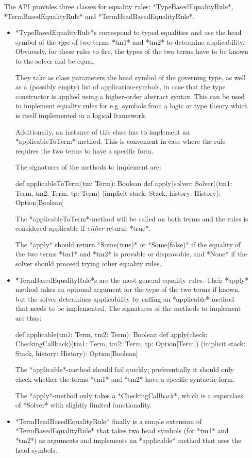 The \mmt API provides three classes for equality rules: *TypeBasedEqualityRule*, *TermBasedEqualityRule* and *TermHeadBasedEqualityRule*.
\begin{itemize}
	\item *TypeBasedEqualityRule*s correspond to typed equalities and use the head symbol of the \emph{type} of two terms *tm1* and *tm2* to determine applicability. Obviously, for these rules to fire, the types of the two terms have to be known to the solver and be equal.
	
	They take as class parameters the head symbol of the governing type, as well as a (possibly empty) list of application-symbols, in case that the type constructor is applied using a higher-order abstract syntax. This can be used to implement equality rules for e.g. symbols from a logic or type theory which is itself implemented in a logical framework.
	
	Additionally, an instance of this class has to implement an *applicableToTerm*-method. This is convenient in case where the rule requires the two terms to have a specific form.
	
	The signatures of the methods to implement are:
\begin{scalacode}
def applicableToTerm(tm: Term): Boolean
def apply(solver: Solver)(tm1: Term, tm2: Term, tp: Term)
	(implicit stack: Stack, history: History): Option[Boolean]
\end{scalacode}
	The *applicableToTerm*-method will be called on both terms and the rules is considered applicable if \emph{either} returns *true*.
	
	The *apply* should return *Some(true)* or *Some(false)* if the equality of the two terms *tm1* and *tm2* is provable or disprovable, and *None* if the solver should proceed trying other equality rules.
	
	\item *TermBasedEqualityRule*s are the most general equality rules. Their *apply* method takes an optional argument for the type of the two terms if known, but the solver determines applicability by calling an *applicable*-method that needs to be implemented. The signatures of the methods to implement are thus:
\begin{scalacode}
def applicable(tm1: Term, tm2: Term): Boolean
def apply(check: CheckingCallback)(tm1: Term, tm2: Term, tp: Option[Term])
	(implicit stack: Stack, history: History): Option[Boolean]
\end{scalacode}
	The *applicable*-method should fail quickly; preferentially it should only check whether the terms *tm1* and *tm2* have a specific syntactic form.
	
	The *apply*-method only takes a *CheckingCallback*, which is a superclass of *Solver* with slightly limited functionality.
	\item *TermHeadBasedEqualityRule* finally is a simple extension of *TermBasedEqualityRule* that takes two head symbols (for *tm1* and *tm2*) as arguments and implements an *applicable* method that uses the head symbols.
\end{itemize}

